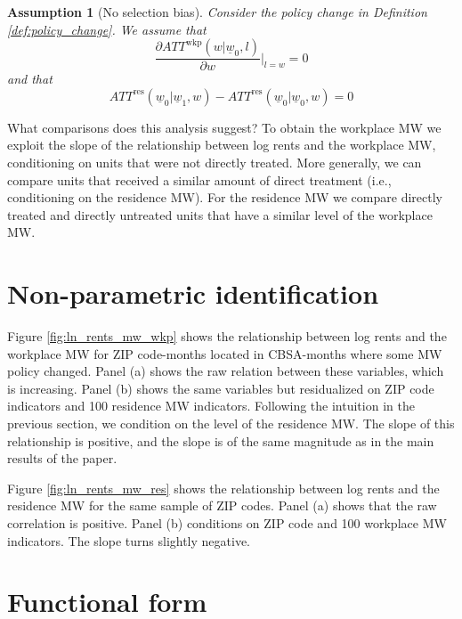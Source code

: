 \documentclass{article}
\newtheorem{assu}{Assumption}
\newcommand{\mw}{\underline{w}}
\newcommand{\wkp}{\text{wkp}}
\newcommand{\res}{\text{res}}
\begin{document}
\begin{assu}[No selection bias] \label{assu:no_selection}
    Consider the policy change in Definition \ref{def:policy_change}.
    We assume that
    \begin{equation*}\label{eq:PT_workplace}
        \frac{\partial ATT^{\wkp}(w | \mw_0, l)}{\partial w} \Big|_{l = w} = 0
    \end{equation*}
    and that
    \begin{equation*}\label{eq:PT_residence}
        ATT^{\res}(\mw_0 | \mw_1, w) - ATT^{\res}(\mw_0 | \mw_0, w) = 0
    \end{equation*}
\end{assu}

What comparisons does this analysis suggest?
To obtain the workplace MW we exploit the slope of the relationship
between log rents and the workplace MW, 
conditioning on units that were not directly treated.
More generally, we can compare units that received a similar amount of direct
treatment (i.e., conditioning on the residence MW).
For the residence MW we compare directly treated and directly untreated units
that have a similar level of the workplace MW.

\section*{Non-parametric identification}

Figure \ref{fig:ln_rents_mw_wkp} shows the relationship between log rents
and the workplace MW for ZIP code-months located in CBSA-months where some
MW policy changed.
Panel (a) shows the raw relation between these variables, which is increasing.
Panel (b) shows the same variables but residualized on ZIP code indicators
and 100 residence MW indicators.
Following the intuition in the previous section, we condition on the level of 
the residence MW.
The slope of this relationship is positive, and the slope is of the same
magnitude as in the main results of the paper.

Figure \ref{fig:ln_rents_mw_res} shows the relationship between log rents
and the residence MW for the same sample of ZIP codes.
Panel (a) shows that the raw correlation is positive.
Panel (b) conditions on ZIP code and 100 workplace MW indicators.
The slope turns slightly negative.

\section*{Functional form}
\end{document}
